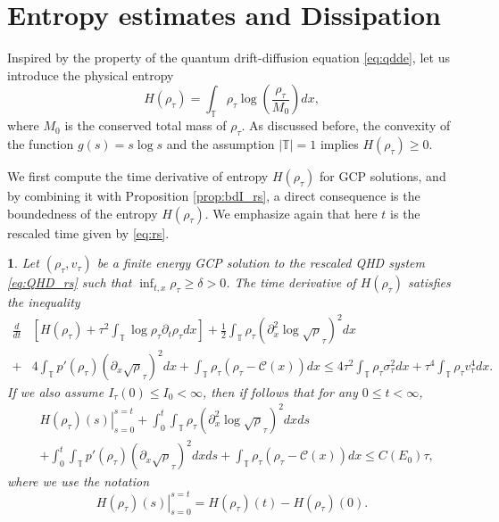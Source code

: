 \documentclass[leqno]{amsart}
\theoremstyle{plain}
\theoremstyle{definition}
\theoremstyle{remark}
\theoremstyle{plain}
\theoremstyle{plain}
\newtheorem{prop}[thm]{\protect\propositionname}
\providecommand{\propositionname}{Proposition}
\def\T{{\mathbb T}}%
\def\d{{\partial}}
\numberwithin{equation}{section}
\begin{document}
\section{Entropy estimates and Dissipation}\label{sect:entrp}

Inspired by the property of the quantum drift-diffusion equation \eqref{eq:qdde}, let us introduce the physical entropy
\begin{equation}\label{eq:entr_1}
H(\rho_\tau)=\int_\T\rho_\tau\log\left(\frac{\rho_\tau}{M_0}\right)dx,
\end{equation}
where $M_0$ is the conserved total mass of $\rho_\tau$. As discussed before, the convexity of the function $g(s)=s\log s$ and the assumption $|\T|=1$ implies $H(\rho_\tau)\geq 0$.

We first compute the time derivative of entropy $H(\rho_\tau)$ for GCP solutions, and by combining it with Proposition \ref{prop:bdI_rs}, a direct consequence is the boundedness of the entropy $H(\rho_{\tau})$. We emphasize again that here $t$ is the rescaled time given by \eqref{eq:rs}.

\begin{prop}\label{prop:entr}
Let $(\rho_\tau,v_\tau)$ be a finite energy GCP solution to the rescaled QHD system \eqref{eq:QHD_rs} such that $\inf_{t,x}\rho_\tau\geq \delta>0$. 
The time derivative of $H(\rho_\tau)$ satisfies the inequality
\begin{equation}\label{eq:ineq_entr_rs}
\begin{aligned}
\frac{d}{dt}&[H(\rho_\tau)+\tau^2\int_\T\log\rho_\tau\d_t\rho_\tau dx]+\frac12\int_\T\rho_\tau(\d_x^2\log\sqrt\rho_\tau)^2dx\\
+&4\int_\T p'(\rho_\tau)(\d_x\sqrt\rho_\tau)^2dx+\int_\T\rho_\tau(\rho_\tau-\mathcal{C}(x))dx\leq4\tau^2\int_\T\rho_\tau\sigma_\tau^2dx+\tau^4\int_\T \rho_\tau v_\tau^4dx.
\end{aligned}
\end{equation}
If we also assume $I_\tau(0)\leq I_0<\infty$, then if follows that for any $0\leq t<\infty$,
\begin{equation}\label{eq:en_bd1}
\begin{aligned}
&\left.H(\rho_{\tau})(s)\right|_{s=0}^{s=t}+\int_0^t\int_\T\rho_\tau(\d_x^2\log\sqrt\rho_\tau)^2dxds\\
&+\int_0^t\int_\T p'(\rho_\tau)(\d_x\sqrt\rho_\tau)^2dxds+\int_\T\rho_\tau(\rho_\tau-\mathcal{C}(x))dx\leq C(E_0)\tau,
\end{aligned}
\end{equation}
where we use the notation
\[
\left.H(\rho_{\tau})(s)\right|_{s=0}^{s=t}=H(\rho_{\tau})(t)-H(\rho_{\tau})(0).
\]
\end{prop}
\end{document}
